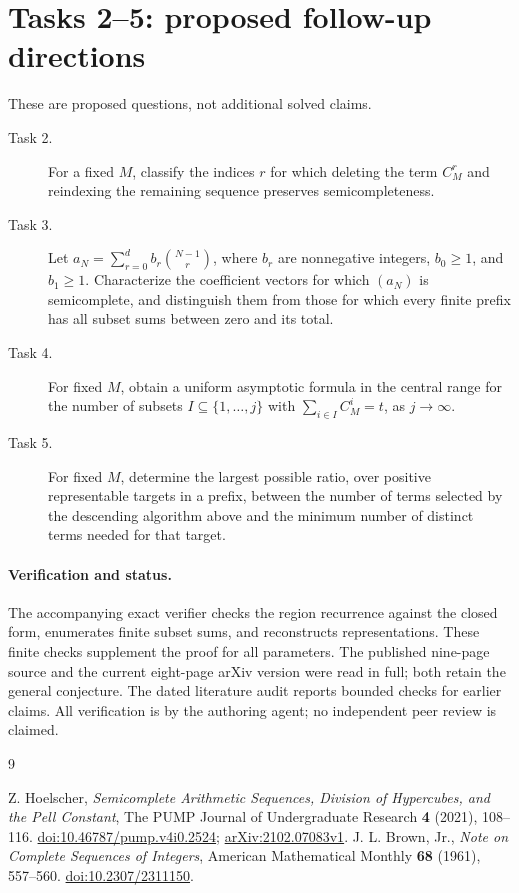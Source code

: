 \documentclass[11pt]{article}
\begin{document}
\section*{Tasks 2--5: proposed follow-up directions}
These are proposed questions, not additional solved claims.
\begin{description}
\item[Task 2.] For a fixed $M$, classify the indices $r$ for which deleting
the term $C_M^r$ and reindexing the remaining sequence preserves
semicompleteness.
\item[Task 3.] Let $a_N=\sum_{r=0}^d b_r\binom{N-1}{r}$, where
$b_r$ are nonnegative integers, $b_0\geq1$, and $b_1\geq1$.
Characterize the coefficient vectors for which $(a_N)$ is semicomplete,
and distinguish them from those for which every finite prefix has all
subset sums between zero and its total.
\item[Task 4.] For fixed $M$, obtain a uniform asymptotic formula in the
central range for the number of subsets $I\subseteq\{1,\ldots,j\}$
with $\sum_{i\in I}C_M^i=t$, as $j\to\infty$.
\item[Task 5.] For fixed $M$, determine the largest possible ratio,
over positive representable targets in a prefix, between the number
of terms selected by the descending algorithm above and the minimum
number of distinct terms needed for that target.
\end{description}

\paragraph{Verification and status.}
The accompanying exact verifier checks the region recurrence against
the closed form, enumerates finite subset sums, and reconstructs
representations. These finite checks supplement the proof for all
parameters. The published nine-page source and the current eight-page
arXiv version were read in full; both retain the general conjecture.
The dated literature audit reports bounded checks for earlier claims.
All verification is by the authoring agent; no independent peer review
is claimed.

\begin{thebibliography}{9}
\raggedright
{} Z. Hoelscher,
\emph{Semicomplete Arithmetic Sequences, Division of Hypercubes,
and the Pell Constant},
The PUMP Journal of Undergraduate Research \textbf{4} (2021), 108--116.
\href{https://doi.org/10.46787/pump.v4i0.2524}{doi:10.46787/pump.v4i0.2524};
\href{https://arxiv.org/abs/2102.07083}{arXiv:2102.07083v1}.
 J. L. Brown, Jr.,
\emph{Note on Complete Sequences of Integers},
American Mathematical Monthly \textbf{68} (1961), 557--560.
\href{https://doi.org/10.2307/2311150}{doi:10.2307/2311150}.
\end{thebibliography}
\end{document}
